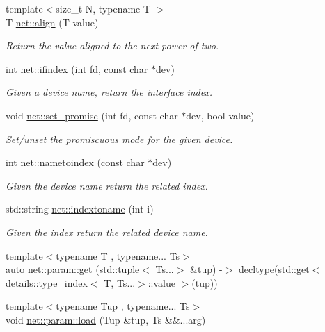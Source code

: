 \begin{DoxyCompactItemize}
\item 
{\footnotesize template$<$size\+\_\+t N, typename T $>$ }\\T \hyperlink{namespacenet_ac59f25900e63bf19f99bbcb44824b134}{net\+::align} (T value)
\begin{DoxyCompactList}\small\item\em Return the value aligned to the next power of two. \end{DoxyCompactList}\item 
int \hyperlink{namespacenet_a01d1d9ebab237e4740263e2deba1ab1d}{net\+::ifindex} (int fd, const char $\ast$dev)
\begin{DoxyCompactList}\small\item\em Given a device name, return the interface index. \end{DoxyCompactList}\item 
void \hyperlink{namespacenet_a69de0e47b041dff359c54fe92eb8830a}{net\+::set\+\_\+promisc} (int fd, const char $\ast$dev, bool value)
\begin{DoxyCompactList}\small\item\em Set/unset the promiscuous mode for the given device. \end{DoxyCompactList}\item 
int \hyperlink{namespacenet_aa90cbca6e910724bc46d5f4c2b12cddf}{net\+::nametoindex} (const char $\ast$dev)
\begin{DoxyCompactList}\small\item\em Given the device name return the related index. \end{DoxyCompactList}\item 
std\+::string \hyperlink{namespacenet_ac7628d7e4c8e89d8ada4d75c292f575f}{net\+::indextoname} (int i)
\begin{DoxyCompactList}\small\item\em Given the index return the related device name. \end{DoxyCompactList}\item 
{\footnotesize template$<$typename T , typename... Ts$>$ }\\auto \hyperlink{namespacenet_1_1param_a9020a1d5f00da972acbea3e809d3c602}{net\+::param\+::get} (std\+::tuple$<$ Ts...$>$ \&tup) -\/$>$ decltype(std\+::get$<$ details\+::type\+\_\+index$<$ T, Ts...$>$\+::value $>$(tup))
\item 
{\footnotesize template$<$typename Tup , typename... Ts$>$ }\\void \hyperlink{namespacenet_1_1param_aef5f360e345f5ab876c171a76a0777a2}{net\+::param\+::load} (Tup \&tup, Ts \&\&...arg)
\end{DoxyCompactItemize}
